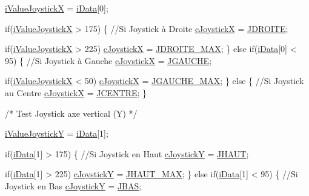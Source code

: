 \begin{DoxyCode}
        \hyperlink{classNunchuck_a931870243c74e9df416639c53670b234}{iValueJoystickX} = \hyperlink{classNunchuck_a6bf3cbe405e9611658f1a6bbc1cd56b4}{iData}[0];

        \textcolor{keywordflow}{if}(\hyperlink{classNunchuck_a931870243c74e9df416639c53670b234}{iValueJoystickX} > 175) \{    \textcolor{comment}{//Si Joystick à Droite}
            \hyperlink{classNunchuck_ad9467642b97b8b008ddd137d273a22f8}{cJoystickX} = \hyperlink{nunchuck_8h_abb937f82823e628ca09a026777179226}{JDROITE};

            \textcolor{keywordflow}{if}(\hyperlink{classNunchuck_a931870243c74e9df416639c53670b234}{iValueJoystickX} > 225)
                \hyperlink{classNunchuck_ad9467642b97b8b008ddd137d273a22f8}{cJoystickX} = \hyperlink{nunchuck_8h_a13baf3bab74f21c7050fb8029bf5b871}{JDROITE\_MAX};
        \}
        \textcolor{keywordflow}{else} \textcolor{keywordflow}{if}(\hyperlink{classNunchuck_a6bf3cbe405e9611658f1a6bbc1cd56b4}{iData}[0] < 95) \{           \textcolor{comment}{//Si Joystick à Gauche}
            \hyperlink{classNunchuck_ad9467642b97b8b008ddd137d273a22f8}{cJoystickX} = \hyperlink{nunchuck_8h_a2948a7fb931671c2935a67be056ec44d}{JGAUCHE};

            \textcolor{keywordflow}{if}(\hyperlink{classNunchuck_a931870243c74e9df416639c53670b234}{iValueJoystickX} < 50)
                \hyperlink{classNunchuck_ad9467642b97b8b008ddd137d273a22f8}{cJoystickX} = \hyperlink{nunchuck_8h_a19f4efb3793bd7fd7da3a60339dc4631}{JGAUCHE\_MAX};
        \}
        \textcolor{keywordflow}{else} \{                              \textcolor{comment}{//Si Joystick au Centre}
            \hyperlink{classNunchuck_ad9467642b97b8b008ddd137d273a22f8}{cJoystickX} = \hyperlink{nunchuck_8h_ac63506adba6ed764c5061ac249623554}{JCENTRE};
        \}


        \textcolor{comment}{/*  Test Joystick axe vertical (Y)    */}

        \hyperlink{classNunchuck_a0e084b1760acfc06305bbb339e3c8232}{iValueJoystickY} = \hyperlink{classNunchuck_a6bf3cbe405e9611658f1a6bbc1cd56b4}{iData}[1];

        \textcolor{keywordflow}{if}(\hyperlink{classNunchuck_a6bf3cbe405e9611658f1a6bbc1cd56b4}{iData}[1] > 175) \{    \textcolor{comment}{//Si Joystick en Haut}
            \hyperlink{classNunchuck_aaf0f299016f5acf686f716518a7ce567}{cJoystickY} = \hyperlink{nunchuck_8h_a624208e4279eb8508e4d7a4cd1983293}{JHAUT};

            \textcolor{keywordflow}{if}(\hyperlink{classNunchuck_a6bf3cbe405e9611658f1a6bbc1cd56b4}{iData}[1] > 225)
                \hyperlink{classNunchuck_aaf0f299016f5acf686f716518a7ce567}{cJoystickY} = \hyperlink{nunchuck_8h_a69c726c7ddc8415a81ea58834356ed2b}{JHAUT\_MAX};
        \}
        \textcolor{keywordflow}{else} \textcolor{keywordflow}{if}(\hyperlink{classNunchuck_a6bf3cbe405e9611658f1a6bbc1cd56b4}{iData}[1] < 95) \{      \textcolor{comment}{//Si Joystick en Bas}
            \hyperlink{classNunchuck_aaf0f299016f5acf686f716518a7ce567}{cJoystickY} = \hyperlink{nunchuck_8h_ad9a8fe51b03c91dc0256cc7502d450a3}{JBAS};


\end{DoxyCode}
